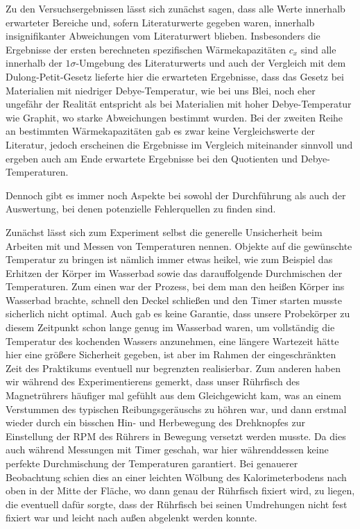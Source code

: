 \documentclass{article}
\begin{document}
Zu den Versuchsergebnissen lässt sich zunächst sagen, dass alle Werte innerhalb erwarteter Bereiche und, sofern Literaturwerte gegeben waren, innerhalb insignifikanter Abweichungen vom Literaturwert blieben. Insbesonders die Ergebnisse der ersten berechneten spezifischen Wärmekapazitäten $c_x$ sind alle innerhalb der $1\sigma$-Umgebung des Literaturwerts und auch der Vergleich mit dem Dulong-Petit-Gesetz lieferte hier die erwarteten Ergebnisse, dass das Gesetz bei Materialien mit niedriger Debye-Temperatur, wie bei uns Blei, noch eher ungefähr der Realität entspricht als bei Materialien mit hoher Debye-Temperatur wie Graphit, wo starke Abweichungen bestimmt wurden. Bei der zweiten Reihe an bestimmten Wärmekapazitäten gab es zwar keine Vergleichswerte der Literatur, jedoch erscheinen die Ergebnisse im Vergleich miteinander sinnvoll und ergeben auch am Ende erwartete Ergebnisse bei den Quotienten und Debye-Temperaturen. 

Dennoch gibt es immer noch Aspekte bei sowohl der Durchführung als auch der Auswertung, bei denen potenzielle Fehlerquellen zu finden sind.

Zunächst lässt sich zum Experiment selbst die generelle Unsicherheit beim Arbeiten mit und Messen von Temperaturen nennen. Objekte auf die gewünschte Temperatur zu bringen ist nämlich immer etwas heikel, wie zum Beispiel das Erhitzen der Körper im Wasserbad sowie das darauffolgende Durchmischen der Temperaturen. Zum einen war der Prozess, bei dem man den heißen Körper ins Wasserbad brachte, schnell den Deckel schließen und den Timer starten musste sicherlich nicht optimal. Auch gab es keine Garantie, dass unsere Probekörper zu diesem Zeitpunkt schon lange genug im Wasserbad waren, um vollständig die Temperatur des kochenden Wassers anzunehmen, eine längere Wartezeit hätte hier eine größere Sicherheit gegeben, ist aber im Rahmen der eingeschränkten Zeit des Praktikums eventuell nur begrenzten realisierbar. Zum anderen haben wir während des Experimentierens gemerkt, dass unser Rührfisch des Magnetrührers häufiger mal gefühlt aus dem Gleichgewicht kam, was an einem Verstummen des typischen Reibungsgeräuschs zu höhren war, und dann erstmal wieder durch ein bisschen Hin- und Herbewegung des Drehknopfes zur Einstellung der RPM des Rührers in Bewegung versetzt werden musste. Da dies auch während Messungen mit Timer geschah, war hier währenddessen keine perfekte Durchmischung der Temperaturen garantiert. Bei genauerer Beobachtung schien dies an einer leichten Wölbung des Kalorimeterbodens nach oben in der Mitte der Fläche, wo dann genau der Rührfisch fixiert wird, zu liegen, die eventuell dafür sorgte, dass der Rührfisch bei seinen Umdrehungen nicht fest fixiert war und leicht nach außen abgelenkt werden konnte.
\end{document}
